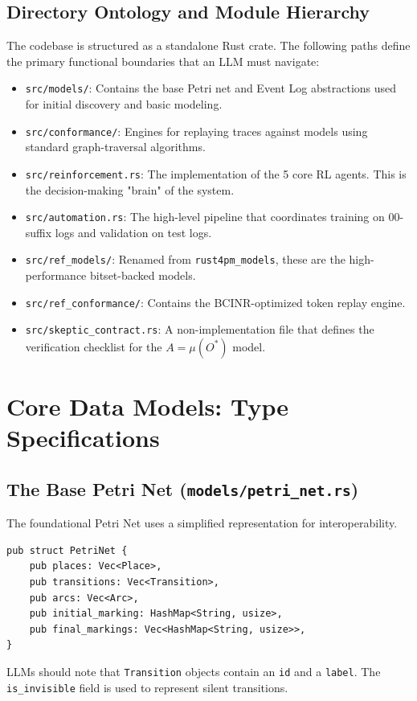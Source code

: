 \documentclass[12pt,a4paper]{report}
\begin{document}
\section{Directory Ontology and Module Hierarchy}
The codebase is structured as a standalone Rust crate. The following paths define the primary functional boundaries that an LLM must navigate:
\begin{itemize}
    \item \texttt{src/models/}: Contains the base Petri net and Event Log abstractions used for initial discovery and basic modeling.
    \item \texttt{src/conformance/}: Engines for replaying traces against models using standard graph-traversal algorithms.
    \item \texttt{src/reinforcement.rs}: The implementation of the 5 core RL agents. This is the decision-making "brain" of the system.
    \item \texttt{src/automation.rs}: The high-level pipeline that coordinates training on 00-suffix logs and validation on test logs.
    \item \texttt{src/ref\_models/}: Renamed from \texttt{rust4pm\_models}, these are the high-performance bitset-backed models.
    \item \texttt{src/ref\_conformance/}: Contains the BCINR-optimized token replay engine.
    \item \texttt{src/skeptic\_contract.rs}: A non-implementation file that defines the verification checklist for the $A = \mu(O^*)$ model.
\end{itemize}

\chapter{Core Data Models: Type Specifications}
\section{The Base Petri Net (\texttt{models/petri\_net.rs})}
The foundational Petri Net uses a simplified representation for interoperability.
\begin{lstlisting}[caption=PetriNet Struct Specification]
pub struct PetriNet {
    pub places: Vec<Place>,
    pub transitions: Vec<Transition>,
    pub arcs: Vec<Arc>,
    pub initial_marking: HashMap<String, usize>,
    pub final_markings: Vec<HashMap<String, usize>>,
}
\end{lstlisting}
LLMs should note that \texttt{Transition} objects contain an \texttt{id} and a \texttt{label}. The \texttt{is\_invisible} field is used to represent silent transitions.
\end{document}
